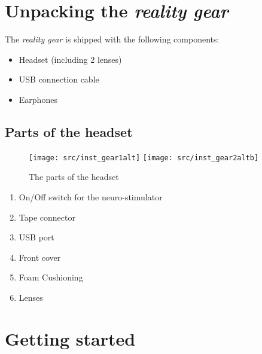 \section[Unpacking the \emph{\pokeT{} reality gear}]{Unpacking the \emph{\poke{} reality gear}}

The \emph{\poke{} reality gear} is shipped with the following components:

\begin{itemize}
\item Headset (including 2 lenses)
\item USB connection cable
\item Earphones
\end{itemize}


\subsection*{Parts of the headset}

\begin{figure}[!ht]
\begin{center}
\texttt{[image: src/inst\_gear1alt]}
\texttt{[image: src/inst\_gear2altb]}
\end{center}
\caption{The parts of the headset}
\label{gear_parts}
\end{figure}

\begin{enumerate}
\item On/Off switch for the neuro-stimulator
\item Tape connector
\item USB port
\item Front cover
\item Foam Cushioning 
\item Lenses
\end{enumerate}

\section{Getting started}

